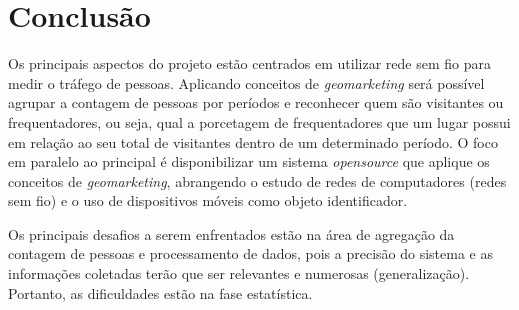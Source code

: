 \chapter{Conclusão}
\label{conclusao}
Os principais aspectos do projeto estão centrados em utilizar rede sem fio para medir o tráfego de pessoas. Aplicando conceitos de \emph{geomarketing} será possível agrupar a contagem de pessoas por períodos
e reconhecer quem são visitantes ou frequentadores, ou seja, qual a porcetagem de frequentadores que um lugar possui em relação ao seu total de visitantes dentro de um determinado período.
O foco em paralelo ao principal é disponibilizar um sistema \emph{opensource} que aplique os conceitos de \emph{geomarketing}, abrangendo o estudo
de redes de computadores (redes sem fio) e o uso de dispositivos móveis como objeto identificador.

Os principais desafios a serem enfrentados estão na área de agregação da contagem de pessoas e processamento de dados, pois a precisão do sistema
e as informações coletadas terão que ser relevantes e numerosas (generalização). Portanto, as dificuldades estão na fase estatística.
